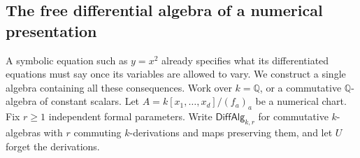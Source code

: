 \documentclass[11pt,a4paper]{article}
\theoremstyle{definition}
\theoremstyle{remark}\newaliascnt{remark}{theorem}
\newcommand{\Q}{\mathbb Q}
\numberwithin{equation}{section}
\begin{document}
\subsection{The free differential algebra of a numerical presentation}\label{sec:free-differential-algebra}

A symbolic equation such as $y=x^2$ already specifies what its differentiated equations must say once its variables are allowed to vary. We construct a single algebra containing all these consequences. Work over $k=\Q$, or a commutative $\Q$-algebra of constant scalars. Let $A=k[x_1,\ldots,x_d]/(f_a)_a$ be a numerical chart. Fix $r\ge1$ independent formal parameters. Write $\mathsf{DiffAlg}_{k,r}$ for commutative $k$-algebras with $r$ commuting $k$-derivations and maps preserving them, and let $U$ forget the derivations.
\end{document}
